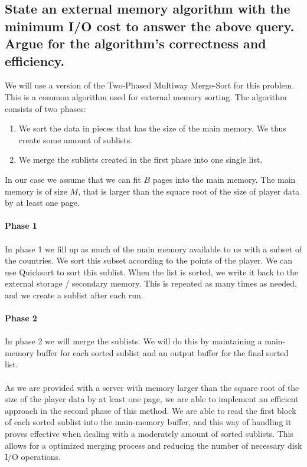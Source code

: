 \documentclass{article}
\begin{document}
\subsection{State an external memory algorithm with the minimum I/O cost to answer the above query. Argue for the algorithm’s correctness and efficiency.}
We will use a version of the Two-Phased Multiway Merge-Sort for this problem. This is a common algorithm used for external memory sorting. The algorithm consists of two phases: 
\begin{enumerate}
    \item We sort the data in pieces that has the size of the main memory. We thus create some amount of sublists.
    \item We merge the sublists created in the first phase into one single list. 
\end{enumerate}
In our case we assume that we can fit $B$ pages into the main memory. The main memory is of size $M$, that is larger than the square root of the size of player data by at least one page.\\\\
\textbf{Phase 1}\\\\
In phase 1 we fill up as much of the main memory available to us with a subset of the countries. We sort this subset according to the points of the player. We can use Quicksort to sort this sublist. When the list is sorted, we write it back to the external storage / secondary memory. This is repeated as many times as needed, and we create a sublist after each run. \\\\
\textbf{Phase 2}\\\\
In phase 2 we will merge the sublists. We will do this by maintaining a main-memory buffer for each sorted sublist and an output buffer for the final sorted list. \\\\
As we are provided with a server with memory larger than the square root of the size of the player data by at least one page, we are able to implement an efficient approach in the second phase of this method. We are able to read the first block of each sorted sublist into the main-memory buffer, and this way of handling it proves effective when dealing with a moderately amount of sorted sublists. This allows for a optimized merging process and reducing the number of necessary disk I/O operations. \\\\
\end{document}
